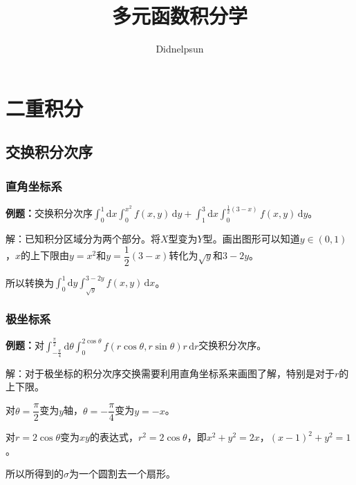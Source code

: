 \documentclass[UTF8, 12pt]{ctexart}
\author{Didnelpsun}
\title{多元函数积分学}
\date{}
\begin{document}
\maketitle
\pagestyle{empty}
\thispagestyle{empty}
\tableofcontents
\thispagestyle{empty}
\newpage
\pagestyle{plain}
\setcounter{page}{1}
\section{二重积分}

\subsection{交换积分次序}

\subsubsection{直角坐标系}

\textbf{例题：}交换积分次序$\int_0^1\textrm{d}x\int_0^{x^2}f(x,y)\,\textrm{d}y+\int_1^3\textrm{d}x\int_0^{\frac{1}{2}(3-x)}f(x,y)\,\textrm{d}y$。

解：已知积分区域分为两个部分。将$X$型变为$Y$型。画出图形可以知道$y\in(0,1)$，$x$的上下限由$y=x^2$和$y=\dfrac{1}{2}(3-x)$转化为$\sqrt{y}$和$3-2y$。

所以转换为$\int_0^1\textrm{d}y\int_{\sqrt{y}}^{3-2y}f(x,y)\,\textrm{d}x$。

\subsubsection{极坐标系}

\textbf{例题：}对$\int_{-\frac{\pi}{4}}^{\frac{\pi}{2}}\textrm{d}\theta\int_0^{2\cos\theta}f(r\cos\theta,r\sin\theta)r\,\textrm{d}r$交换积分次序。

解：对于极坐标的积分次序交换需要利用直角坐标系来画图了解，特别是对于$r$的上下限。

对$\theta=\dfrac{\pi}{2}$变为$y$轴，$\theta=-\dfrac{\pi}{4}$变为$y=-x$。

对$r=2\cos\theta$变为$xy$的表达式，$r^2=2\cos\theta$，即$x^2+y^2=2x$，$(x-1)^2+y^2=1$。

所以所得到的$\sigma$为一个圆割去一个扇形。
\end{document}
